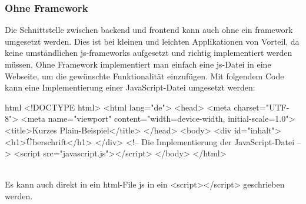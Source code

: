 \subsubsection{Ohne Framework}
Die Schnittstelle zwischen \Gls{backend} und \Gls{frontend} kann auch ohne ein \Gls{framework} umgesetzt werden. Dies ist bei kleinen und leichten Applikationen von Vorteil, da keine umständlichen \Gls{js}-\Gls{framework}s aufgesetzt und richtig implementiert werden müssen. Ohne Framework implementiert man einfach eine \Gls{js}-Datei in eine Webseite, um die gewünschte Funktionalität einzufügen. Mit folgendem Code kann eine Implementierung einer JavaScript-Datei umgesetzt werden:
\begin{code}{html}
	<!DOCTYPE html>
	<html lang="de">
		<head>
			<meta charset="UTF-8">
			<meta name="viewport" content="width=device-width, initial-scale=1.0">
			<title>Kurzes Plain-Beispiel</title>
		</head>
		<body>
			<div id="inhalt">
				<h1>Überschrift</h1>
			</div>
			<!-- Die Implementierung der JavaScript-Datei -->
			<script src="javascript.js"></script>
		</body>
	</html>
\end{code}
~\\
Es kann auch direkt in ein \Gls{html}-File \Gls{js} in ein <script></script> geschrieben werden.
\newpage
